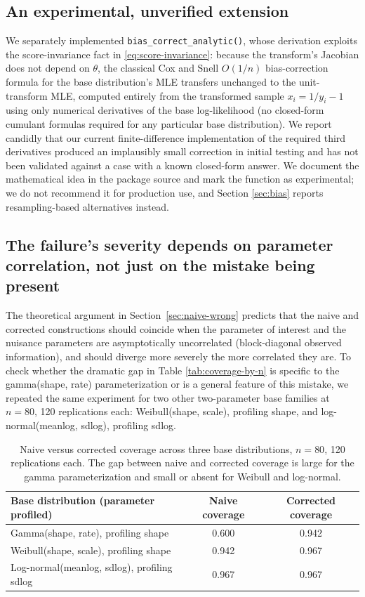 \subsection{An experimental, unverified extension}

We separately implemented \texttt{bias\_correct\_analytic()}, whose
derivation exploits the score-invariance fact in
\eqref{eq:score-invariance}: because the transform's Jacobian does not
depend on $\theta$, the classical Cox and Snell \citep{coxsnell1968}
$O(1/n)$ bias-correction formula for the base distribution's MLE
transfers unchanged to the unit-transform MLE, computed entirely from
the transformed sample $x_i = 1/y_i - 1$ using only numerical
derivatives of the base log-likelihood (no closed-form cumulant
formulas required for any particular base distribution). We report
candidly that our current finite-difference implementation of the
required third derivatives produced an implausibly small correction in
initial testing and has not been validated against a case with a known
closed-form answer. We document the mathematical idea in the package
source and mark the function as experimental; we do not recommend it
for production use, and Section \ref{sec:bias} reports
resampling-based alternatives instead.

\subsection{The failure's severity depends on parameter correlation, not just on the mistake being present}

The theoretical argument in Section~\ref{sec:naive-wrong} predicts that the naive and
corrected constructions should coincide when the parameter of interest
and the nuisance parameters are asymptotically uncorrelated (block-diagonal
observed information), and should diverge more severely the more
correlated they are. To check whether the dramatic gap in Table
\ref{tab:coverage-by-n} is specific to the gamma(shape, rate)
parameterization or is a general feature of this mistake, we repeated
the same experiment for two other two-parameter base families at
$n=80$, 120 replications each: Weibull(shape, scale), profiling shape,
and log-normal(meanlog, sdlog), profiling sdlog.

\begin{table}[htbp]
\centering
\begin{tabular}{@{}lcc@{}}
\toprule
Base distribution (parameter profiled) & Naive coverage & Corrected coverage \\
\midrule
Gamma(shape, rate), profiling shape & 0.600 & 0.942 \\
Weibull(shape, scale), profiling shape & 0.942 & 0.967 \\
Log-normal(meanlog, sdlog), profiling sdlog & 0.967 & 0.967 \\
\bottomrule
\end{tabular}
\caption{Naive versus corrected coverage across three base distributions,
$n=80$, 120 replications each. The gap between naive and corrected
coverage is large for the gamma parameterization and small or absent
for Weibull and log-normal.}
\label{tab:coverage-by-family}
\end{table}

